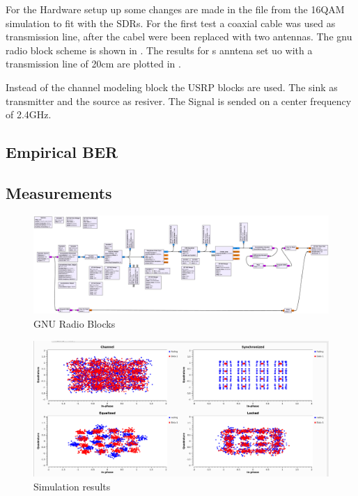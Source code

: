 For the Hardware setup up some changes are made in the file from the 16QAM simulation to fit with the SDRs. For the first test a coaxial cable was used as transmission line, after the cabel were been replaced with two antennas. The gnu radio block scheme is shown in . The results for s anntena set uo with a transmission line of 20cm  are plotted in .

Instead of the channel modeling block the USRP blocks are used. The sink as transmitter and the source as resiver.  The Signal is sended on a center frequency of 2.4GHz.

\subsection{Empirical BER} \label{sec:ber}

\subsection{Measurements}

%
%
%

\begin{figure}
	\includegraphics[width=\linewidth]{./figures/pdfs/qam_nogui.pdf}
	\caption{GNU Radio Blocks}
	\label{fig:simul16QAM_block}	
\end{figure}

\begin{figure}
	\includegraphics[width=\linewidth]{./figures/screenshots/QAM16_Fading_2.png}
	\caption{Simulation results}
	\label{fig:simul16QAM}	
\end{figure}

